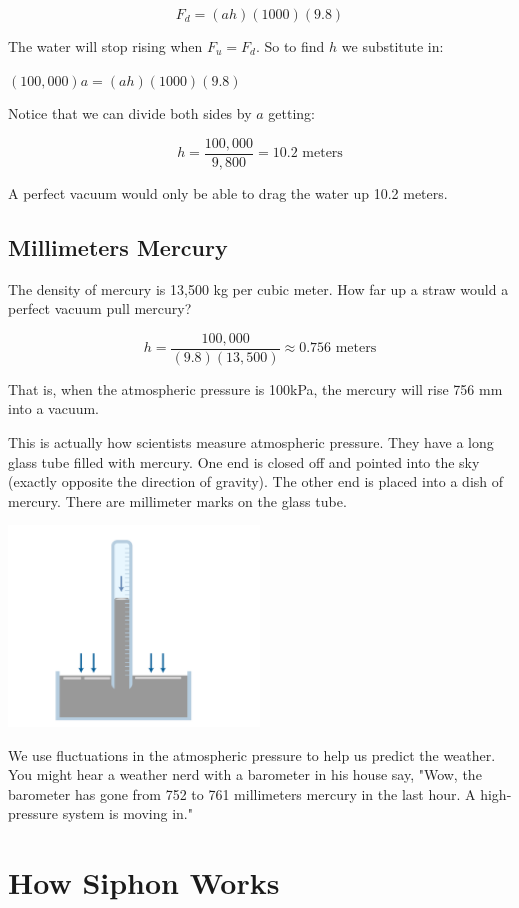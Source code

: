 $$F_d = (ah)(1000)(9.8)$$

The water will stop rising when $F_u = F_d$.  So to find $h$ we substitute in:

$(100,000)a = (ah)(1000)(9.8)$

Notice that we can divide both sides by $a$ getting:

$$h = \frac{100,000}{9,800} = 10.2 \text{ meters}$$

A perfect vacuum would only be able to drag the water up 10.2 meters.

\subsection{Millimeters Mercury}

The density of mercury is 13,500 kg per cubic meter.  How far up a straw would a perfect vacuum pull mercury? 

$$h = \frac{100,000}{(9.8)(13,500)} \approx 0.756 \text{ meters}$$

That is, when the atmospheric pressure is 100kPa,  the mercury will rise 756 mm into a vacuum.

This is actually how scientists measure atmospheric pressure.   They have a long glass tube filled with mercury.  One end is closed off and pointed into the sky (exactly opposite the direction of gravity).  The other end is placed into a dish of mercury.  There are millimeter marks on the glass tube.

\includegraphics[width=0.5\textwidth]{barometer.png}


We use fluctuations in the atmospheric pressure to help us predict the weather.  You might hear a weather nerd with a barometer in his house say, "Wow, the barometer has gone from 752 to 761 millimeters mercury in the last hour.  A high-pressure system is moving in." 


\section{How Siphon Works}

